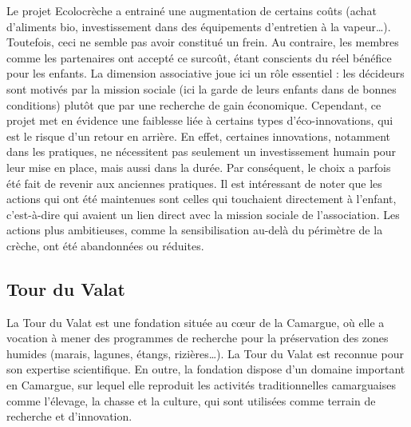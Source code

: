         Le projet Ecolocrèche a entrainé une augmentation de certains coûts (achat d’aliments bio, investissement dans des équipements d’entretien à la vapeur…). Toutefois, ceci ne semble pas avoir constitué un frein. Au contraire, les membres comme les partenaires ont accepté ce surcoût, étant conscients du réel bénéfice pour les enfants. La dimension associative joue ici un rôle essentiel : les décideurs sont motivés par la mission sociale (ici la garde de leurs enfants dans de bonnes conditions) plutôt que par une recherche de gain économique. Cependant, ce projet met en évidence une faiblesse liée à certains types d’éco-innovations, qui est le risque d’un retour en arrière. En effet, certaines innovations, notamment dans les pratiques, ne nécessitent pas seulement un investissement humain pour leur mise en place, mais aussi dans la durée. Par conséquent, le choix a parfois été fait de revenir aux anciennes pratiques. Il est intéressant de noter que les actions qui ont été maintenues sont celles qui touchaient directement à l’enfant, c'est-à-dire qui avaient un lien direct avec la mission sociale de l’association. Les actions plus ambitieuses, comme la sensibilisation au-delà du périmètre de la crèche, ont été abandonnées ou réduites.


    \subsection{Tour du Valat }

        La Tour du Valat est une fondation située au cœur de la Camargue, où elle a vocation à mener des programmes de recherche pour la préservation des zones humides (marais, lagunes, étangs, rizières…). La Tour du Valat est reconnue pour son expertise scientifique. En outre, la fondation dispose d’un domaine important en Camargue, sur lequel elle reproduit les activités traditionnelles camarguaises comme l’élevage, la chasse et la culture, qui sont utilisées comme terrain de recherche et d’innovation.

